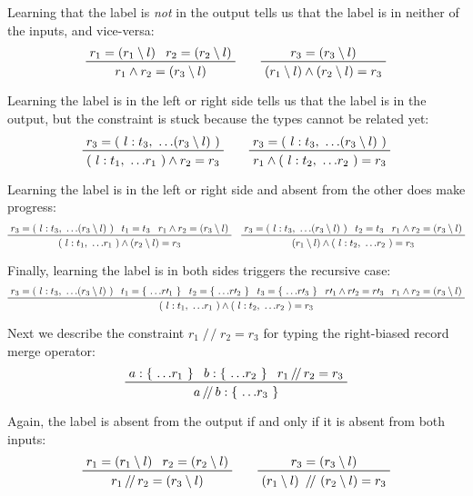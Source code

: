 \documentclass[11pt, twoside, reqno]{book}
\begin{document}
Learning that the label is \emph{not} in the output tells us that the label is in neither of the inputs, and vice-versa:
\begin{displaymath}
\prftree{r_1 = (r_1 \setminus l)}{r_2 = (r_2 \setminus l)}{r_1 \land r_2 = (r_3 \setminus l)}
\qquad
\prftree{r_3 = (r_3 \setminus l)}{(r_1 \setminus l) \land (r_2 \setminus l) = r_3}
\end{displaymath}

Learning the label is in the left or right side tells us that the label is in the output, but the constraint is stuck because the types cannot be related yet:
\begin{displaymath}
\prftree
  {r_3 = (\ l : t_3,\ \dots\!(r_3 \setminus l)\ )}
  {(\ l : t_1,\ \dots\!r_1\ ) \land r_2 = r_3}
\qquad
\prftree
  {r_3 = (\ l : t_3,\ \dots\!(r_3 \setminus l)\ )}
  {r_1 \land (\ l : t_2,\ \dots\!r_2\ ) = r_3}
\end{displaymath}

Learning the label is in the left or right side and absent from the other does make progress:
\begin{displaymath}
\prftree
  {r_3 = (\ l : t_3,\ \dots\!(r_3 \setminus l)\ )}
  {t_1 = t_3}
  {r_1 \land r_2 = (r_3 \setminus l)}
  {(\ l : t_1,\ \dots\!r_1\ ) \land (r_2 \setminus l) = r_3}
\quad
\prftree
  {r_3 = (\ l : t_3,\ \dots\!(r_3 \setminus l)\ )}
  {t_2 = t_3}
  {r_1 \land r_2 = (r_3 \setminus l)}
  {(r_1 \setminus l) \land (\ l : t_2,\ \dots\!r_2\ ) = r_3}
\end{displaymath}

Finally, learning the label is in both sides triggers the recursive case:
\begin{displaymath}
\prftree
  {r_3 = (\ l : t_3,\ \dots\!(r_3 \setminus l)\ )}
  {t_1 = \{\ \dots\!r\prime_1\ \}}
  {t_2 = \{\ \dots\!r\prime_2\ \}}  
  {t_3 = \{\ \dots\!r\prime_3\ \}}
  {r\prime_1 \land r\prime_2 = r\prime_3}
  {r_1 \land r_2 = (r_3 \setminus l)}
  {(\ l : t_1,\ \dots\!r_1\ ) \land (\ l : t_2,\ \dots\!r_2\ ) = r_3}
\end{displaymath}



Next we describe the constraint $r_1 \mathop{/\!/} r_2 = r_3$ for typing the right-biased record merge operator:
\begin{displaymath}
\prftree{a : \{\ \dots\!r_1\ \}}{b : \{\ \dots\!r_2\ \}}{r_1 \mathop{/\!/} r_2 = r_3}{a \mathop{/\!/} b : \{\ \dots\!r_3\ \}}
\end{displaymath}

Again, the label is absent from the output if and only if it is absent from both inputs:
\begin{displaymath}
\prftree{r_1 = (r_1 \setminus l)}{r_2 = (r_2 \setminus l)}{r_1 \mathop{/\!/} r_2 = (r_3 \setminus l)}
\qquad
\prftree{r_3 = (r_3 \setminus l)}{(r_1 \setminus l)\ \mathop{/\!/}\ (r_2 \setminus l) = r_3}
\end{displaymath}
\end{document}

